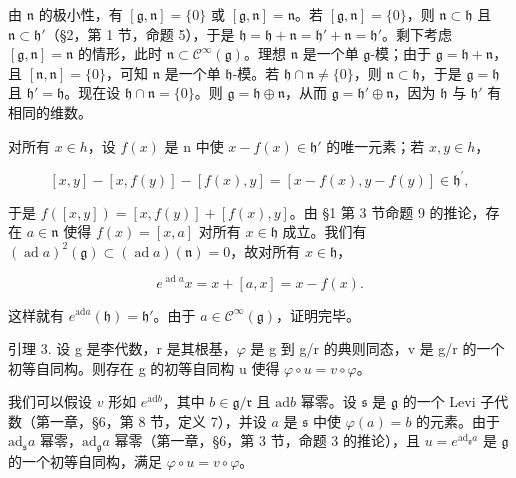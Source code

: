 由 \(\mathfrak{n}\) 的极小性，有 \([\mathfrak{g},\mathfrak{n}] = \{0\}\) 或 \([\mathfrak{g},\mathfrak{n}] = \mathfrak{n}\)。若 \([\mathfrak{g},\mathfrak{n}] = \{0\}\)，则 \(\mathfrak{n} \subset \mathfrak{h}\) 且 \(\mathfrak{n} \subset \mathfrak{h}'\)（§2，第 1 节，命题 5），于是 \(\mathfrak{h} = \mathfrak{h} + \mathfrak{n} = \mathfrak{h}' + \mathfrak{n} = \mathfrak{h}'\)。剩下考虑 \([\mathfrak{g},\mathfrak{n}] = \mathfrak{n}\) 的情形，此时 \(\mathfrak{n} \subset \mathcal{C}^{\infty}(\mathfrak{g})\)。理想 \(\mathfrak{n}\) 是一个单 \(\mathfrak{g}\)-模；由于 \(\mathfrak{g} = \mathfrak{h} + \mathfrak{n}\)，且 \([\mathfrak{n},\mathfrak{n}] = \{0\}\)，可知 \(\mathfrak{n}\) 是一个单 \(\mathfrak{h}\)-模。若 \(\mathfrak{h} \cap \mathfrak{n} \neq \{0\}\)，则 \(\mathfrak{n} \subset \mathfrak{h}\)，于是 \(\mathfrak{g} = \mathfrak{h}\) 且 \(\mathfrak{h}' = \mathfrak{h}\)。现在设 \(\mathfrak{h} \cap \mathfrak{n} = \{0\}\)。则 \(\mathfrak{g} = \mathfrak{h} \oplus \mathfrak{n}\)，从而 \(\mathfrak{g} = \mathfrak{h}' \oplus \mathfrak{n}\)，因为 \(\mathfrak{h}\) 与 \(\mathfrak{h}'\) 有相同的维数。

对所有 \(x \in h\)，设 \(f(x)\) 是 n 中使 \(x - f(x) \in \mathfrak{h}'\) 的唯一元素；若 \(x, y \in h\)，

\[
[ x, y ] - [ x, f (y) ] - [ f (x), y ] = [ x - f (x), y - f (y) ] \in \mathfrak {h} ^ {\prime},
\]

于是 \(f([x,y]) = [x,f(y)] + [f(x),y]\)。由 §1 第 3 节命题 9 的推论，存在 \(a \in \mathfrak{n}\) 使得 \(f(x) = [x,a]\) 对所有 \(x \in \mathfrak{h}\) 成立。我们有 \((\operatorname{ad}a)^2(\mathfrak{g}) \subset (\operatorname{ad}a)(\mathfrak{n}) = 0\)，故对所有 \(x \in \mathfrak{h}\)，

\[
e ^ {\operatorname{ad} a} x = x + [ a, x ] = x - f (x).
\]

这样就有 \(e^{\mathrm{ad}a}(\mathfrak{h}) = \mathfrak{h}'\)。由于 \(a \in \mathcal{C}^{\infty}(\mathfrak{g})\)，证明完毕。

引理 3. 设 g 是李代数，r 是其根基，\(\varphi\) 是 g 到 g/r 的典则同态，v 是 g/r 的一个初等自同构。则存在 g 的初等自同构 u 使得 \(\varphi \circ u = v \circ \varphi\)。

我们可以假设 \(v\) 形如 \(e^{\mathrm{ad}b}\)，其中 \(b \in \mathfrak{g} / \mathfrak{r}\) 且 \(\mathrm{ad}b\) 幂零。设 \(\mathfrak{s}\) 是 \(\mathfrak{g}\) 的一个 Levi 子代数（第一章，§6，第 8 节，定义 7），并设 \(a\) 是 \(\mathfrak{s}\) 中使 \(\varphi(a) = b\) 的元素。由于 \(\mathrm{ad}_{\mathfrak{s}}a\) 幂零，\(\mathrm{ad}_{\mathfrak{g}}a\) 幂零（第一章，§6，第 3 节，命题 3 的推论），且 \(u = e^{\mathrm{ad}_{\mathfrak{g}}a}\) 是 \(\mathfrak{g}\) 的一个初等自同构，满足 \(\varphi \circ u = v \circ \varphi\)。

